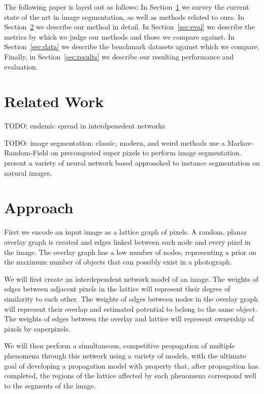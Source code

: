 \documentclass[twocolumn]{article}
\newcommand{\todo}[1]{}
\renewcommand{\todo}[1]{{\color{red} TODO: {#1}}}
\newcommand{\secref}[1]{Section~\ref{sec:#1}}
\newcommand{\seclab}[1]{\label{sec:#1}}
\begin{document}
The following paper is layed out as follows: In \secref{related} we survey the
current state of the art in image segmentation, as well as methods related to
ours. In \secref{approach} we describe our method in detail. In \secref{eval} we
describe the metrics by which we judge our methods and those we compare against.
In \secref{data} we describe the benchmark datasets against which we compare.
Finally, in \secref{results} we describe our resulting performance and
evaluation.

\section{Related Work}\seclab{related}

\todo{endemic spread in interdpenedent networks}

\todo{image segmentation: classic, modern, and weird methods}
\cite{pei2014saliency} use a Markov-Random-Field on precomputed super pixels to
perform image segmentation.  \cite{newell2017associative,li2017fully,ren2017end}
present a variety of neural network based approached to instance segmentation on
natural images.

\section{Approach}\seclab{approach}

First we encode an input image as a lattice graph of pixels. A random, planar
overlay graph is created and edges linked between each node and every pixel in
the image. The overlay graph has a low number of nodes, representing a prior on
the maximum number of objects that can possibly exist in a photograph. 

We will first create an interdependent network model of an image. The weights of
edges between adjacent pixels in the lattice will represent their degree of
similarity to each other. The weights of edges between nodes in the overlay
graph will represent their overlap and estimated potential to belong to the same
object. The weights of edges between the overlay and lattice will represent
ownership of pixels by superpixels.

We will then perform a simultaneous, competitive propagation of multiple
phenomena through this network using a variety of models, with the ultimate goal
of developing a propagation model with property that, after propagation has
completed, the regions of the lattice affected by each phenomena correspond well
to the segments of the image.
\end{document}
